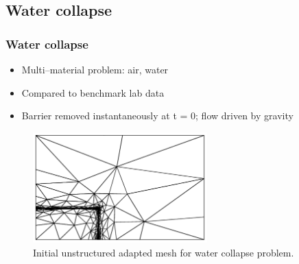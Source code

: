 \subsection{Water collapse}

\begin{frame}
    \frametitle{Water collapse}
\begin{itemize}
\item Multi--material problem: air, water
\item Compared to benchmark lab data
\item Barrier removed instantaneously at t = 0; flow driven by gravity
\end{itemize}

\begin{figure}
\centering
\includegraphics[width=0.6\textwidth, clip=true]{./water_collapse/water_collapse_0_mesh.pdf}
\caption{Initial unstructured adapted mesh for water collapse problem.}
\end{figure}

\end{frame}
%

